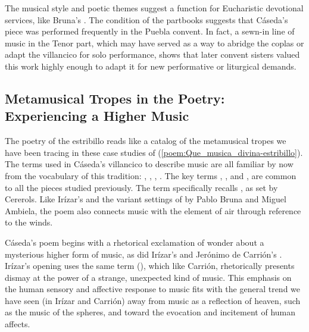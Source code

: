 The musical style and poetic themes suggest a function for Eucharistic devotional services, like Bruna's .
The condition of the partbooks suggests that Cáseda's piece was performed frequently in the Puebla convent.
In fact, a sewn-in line of music in the Tenor part, which may have served as a way to abridge the coplas or adapt the villancico for solo performance, shows that later convent sisters valued this work highly enough to adapt it for new performative or liturgical demands.

\subsection{Metamusical Tropes in the Poetry: Experiencing a Higher Music}

The poetry of the estribillo reads like a catalog of the metamusical tropes we have been tracing in these case studies of  (\cref{poem:Que_musica_divina-estribillo}).
The terms used in Cáseda's villancico to describe music are all familiar by now from the vocabulary of this tradition: , , , . 
The key terms , , and , are common to all the pieces studied previously.
The term  specifically recalls , as set by Cererols. 
Like Irízar's  and the variant settings of  by Pablo Bruna and Miguel Ambiela, the poem also connects music with the element of air through reference to the winds.

% 	

% 	

Cáseda's poem begins with a rhetorical exclamation of wonder about a mysterious higher form of music, as did Irízar's  and Jerónimo de Carrión's .
Irízar's opening uses the same term (), which like Carrión, rhetorically presents dismay at the power of a strange, unexpected kind of music.
This emphasis on the human sensory and affective response to music fits with the general trend we have seen (in Irízar and Carrión) away from music as a reflection of heaven, such as the music of the spheres, and toward the evocation and incitement of human affects.

